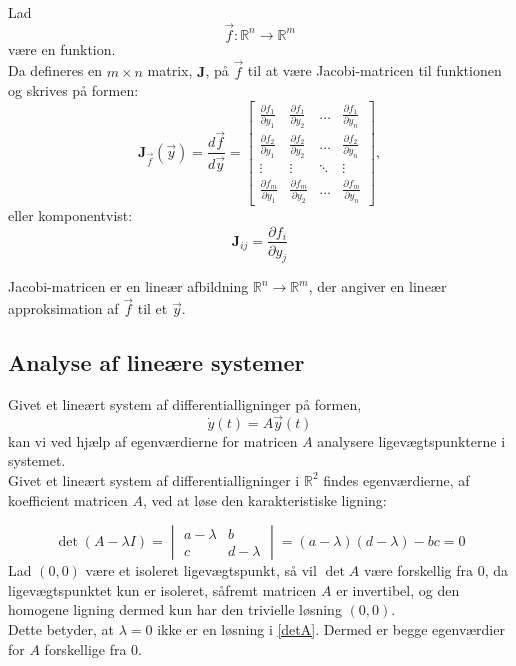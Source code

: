 \begin{definition}
Lad $$\vec{f}: \mathbb{R}^n \to \mathbb{R}^m$$ være en funktion. \\ Da defineres en $m \times n$ matrix, $\textbf{J}$, på $\vec{f}$ til at være Jacobi-matricen til funktionen og skrives på formen:
$$\textbf{J}_{\vec{f}}(\vec{y}) = \frac{d\vec f}{d\vec{y}} =
\begin{bmatrix}
    \frac{\partial f_1}{\partial y_{1}} & \frac{\partial f_1}{\partial y_{2}} & \dots & \frac{\partial f_1}{\partial y_{n}} \\
    \frac{\partial f_2}{\partial y_{1}} & \frac{\partial f_2}{\partial y_{2}} & \dots & \frac{\partial f_2}{\partial y_{n}} \\
    \vdots & \vdots & \ddots & \vdots \\
    \frac{\partial f_m}{\partial y_{1}} & \frac{\partial f_m}{\partial y_{2}} & \dots & \frac{\partial f_m}{\partial y_{n}}
\end{bmatrix},$$
eller komponentvist:
$$\textbf{J}_{ij} = \frac{\partial f_i}{\partial y_j}$$

Jacobi-matricen er en lineær afbildning $\mathbb{R}^n \to \mathbb{R}^m$, der angiver en lineær approksimation af $\vec{f}$ til et $\vec{y}$.
\end{definition}

\subsection{Analyse af lineære systemer}\label{AnalLinSys}

Givet et lineært system af differentialligninger på formen,
$$\dot{y}(t) = A \vec{y}(t)$$
kan vi ved hjælp af egenværdierne for matricen $A$ analysere ligevægtspunkterne i systemet. \\ 
Givet et lineært system af differentialligninger i $\mathbb{R}^2$ findes egenværdierne, af koefficient matricen $A$, ved at løse den karakteristiske ligning:

\begin{equation}
 \det(A-\lambda I)= \begin{vmatrix}
a-\lambda & b \\
c & d -\lambda
\end{vmatrix}=(a-\lambda)(d-\lambda)-bc=0
\label{detA}
\end{equation}
Lad $(0,0)$ være et isoleret ligevægtspunkt, så vil $\det A$ være forskellig fra $0$, da ligevægtspunktet kun er isoleret, såfremt matricen $A$ er invertibel, og den homogene ligning dermed kun har den trivielle løsning $(0,0)$.\\
Dette betyder, at $\lambda=0$ ikke er en løsning i \eqref{detA}. Dermed er begge egenværdier for $A$ forskellige fra $0$.

